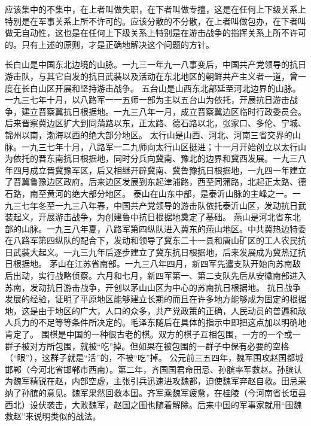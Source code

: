 应该集中的不集中，在上者叫做失职，在下者叫做专擅，这是在任何上下级关系上特别是在军事关系上所不许可的。应该分散的不分散，在上者叫做包办，在下者叫做无自动性，这也是在任何上下级关系上特别是在游击战争的指挥关系上所不许可的。只有上述的原则，才是正确地解决这个问题的方针。


\begin{maonote}
长白山是中国东北边境的山脉。一九三一年九一八事变后，中国共产党领导的抗日游击队，与其它自发的抗日武装以及活动在东北地区的朝鲜共产主义者一道，曾一度在长白山区开展和坚持游击战争。
五台山是山西东北部延至河北边界的山脉。一九三七年十月，以八路军一一五师一部为主以五台山为依托，开展抗日游击战争，建立晋察冀抗日根据地。一九三八年一月，成立晋察冀边区临时行政委员会。后来晋察冀边区扩大到同蒲路以东，正太路、德石路以北，张家口、多伦、宁城、锦州以南，渤海以西的绝大部分地区。
太行山是山西、河北、河南三省交界的山脉。一九三七年十月，八路军一二九师向太行山区挺进；十一月开始创立以太行山为依托的晋东南抗日根据地，同时分兵向冀南、豫北的边界和冀西发展。一九三八年四月成立晋冀豫军区，后又相继开辟冀南、冀鲁豫抗日根据地，一九四一年建立了晋冀鲁豫边区政府。后来边区发展到东起津浦路，西至同蒲路，北起正太路、德石路，南至黄河的绝大部分地区。
泰山在山东中部，是泰沂山脉的主峰之一。一九三七年冬至一九三八年春，中国共产党领导的游击队依托泰沂山区，发动抗日武装起义，开展游击战争，为创建鲁中抗日根据地奠定了基础。
燕山是河北省东北部的山脉。一九三八年夏，八路军第四纵队进入冀东的燕山地区。中共冀热边特委在八路军第四纵队的配合下，发动和领导了冀东二十一县和唐山矿区的工人农民抗日武装大起义。一九三九年后逐步建立了冀东抗日根据地，后来发展成为冀热辽抗日根据地。
茅山在江苏省南部。一九三八年四月，新四军先遣支队开始向苏南敌后出动，实行战略侦察。六月和七月，新四军第一、第二支队先后从安徽南部进入苏南，发动抗日游击战争，开创以茅山山区为中心的苏南抗日根据地。
抗日战争发展的经验，证明了平原地区能够建立长期的而且在许多地方能够成为固定的根据地，这是由于地区的广大，人口的众多，共产党政策的正确，人民动员的普遍和敌人兵力的不足等等条件所决定的。毛泽东随后在具体的指示中即把这点加以明确地肯定了。
围棋是中国的一种很古老的棋。双方的棋子互相包围，一方的一个或一群子被对方所包围，就被“吃”掉。但如果在被包围的一群子中保有必要的空格（“眼”），这群子就是“活”的，不被“吃”掉。
公元前三五四年，魏军围攻赵国都城邯郸（今河北省邯郸市西南）。第二年，齐国国君命田忌、孙膑率军救赵。孙膑认为魏军精锐在赵，内部空虚，主张引兵迅速进攻魏都，迫使魏军弃赵自救。田忌采纳了孙膑的意见。魏军果然回救本国。齐军乘魏军疲惫，在桂陵（今河南省长垣县西北）设伏袭击，大败魏军，赵国之围也随着解除。后来中国的军事家就用“围魏救赵”来说明类似的战法。
\end{maonote}
